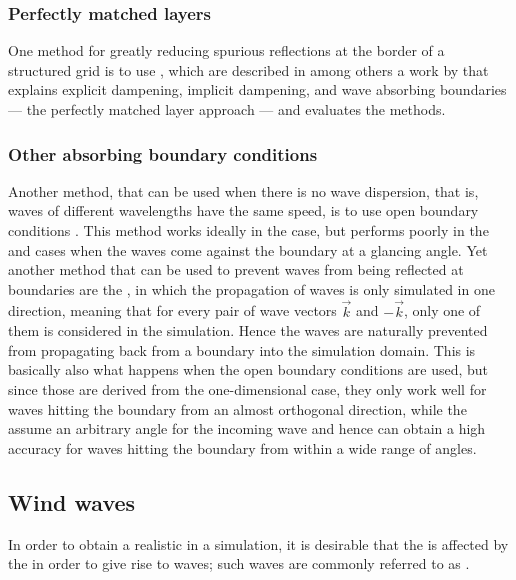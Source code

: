 \subsubsection{Perfectly matched layers}

One method for greatly reducing spurious reflections at the border of a structured grid is to use , which are described in among others a work by \citet{Soderstrom2010} that explains explicit dampening, implicit dampening, and wave absorbing boundaries --- the perfectly matched layer approach --- and evaluates the methods.

\subsubsection{Other absorbing boundary conditions}

Another method, that can be used when there is no wave dispersion, that is, waves of different wavelengths have the same speed, is to use open boundary conditions \citep{Muller-Fischer2008}. This method works ideally in the  case, but performs poorly in the  and  cases when the waves come against the boundary at a glancing angle. Yet another method that can be used to prevent waves from being reflected at boundaries are the \AWWE \citep{Guddati2005}, in which the propagation of waves is only simulated in one direction, meaning that for every pair of wave vectors $\vec{k}$ and $-\vec{k}$, only one of them is considered in the simulation. Hence the waves are naturally prevented from propagating back from a boundary into the simulation domain. This is basically also what happens when the open boundary conditions are used, but since those are derived from the one-dimensional case, they only work well for waves hitting the boundary from an almost orthogonal direction, while the \AWWE assume an arbitrary angle for the incoming wave and hence can obtain a high accuracy for waves hitting the boundary from within a wide range of angles.

\subsection{Wind waves}

In order to obtain a realistic  in a simulation, it is desirable that the  is affected by the \wind in order to give rise to waves; such waves are commonly referred to as .

